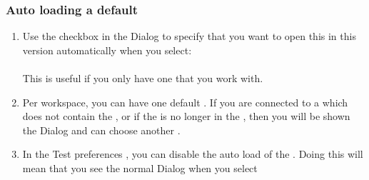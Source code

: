 \subsubsection{Auto loading a default \gdproject{}}
\label{TasksAutoLoadProject}
\begin{enumerate}
\item Use the checkbox in the  Dialog to specify that you want to open this \gdproject{} in this version automatically when you select:\\
\\
This is useful if you only have one \gdproject{} that you work with.
\item Per workspace, you can have one default \gdproject{}. If you are connected to a \gddb{} which does not contain the \gdproject{}, or if the \gdproject{} is no longer in the \gddb{}, then you will be shown the  Dialog and can choose another \gdproject{}. 
\item In the Test preferences , you can disable the auto load of the \gdproject{}. Doing this will mean that you see the normal   Dialog when you select\\
 \\
\end{enumerate}


